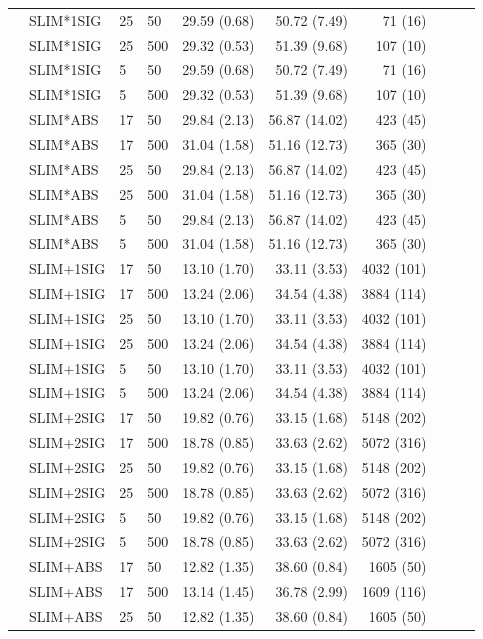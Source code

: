 \begin{longtable}{llllrrrrrr}
 & SLIM*1SIG & 25 & 50 & 29.59 (0.68) & 50.72 (7.49) & 71 (16) \\
 & SLIM*1SIG & 25 & 500 & 29.32 (0.53) & 51.39 (9.68) & 107 (10) \\
 & SLIM*1SIG & 5 & 50 & 29.59 (0.68) & 50.72 (7.49) & 71 (16) \\
 & SLIM*1SIG & 5 & 500 & 29.32 (0.53) & 51.39 (9.68) & 107 (10) \\
 & SLIM*ABS & 17 & 50 & 29.84 (2.13) & 56.87 (14.02) & 423 (45) \\
 & SLIM*ABS & 17 & 500 & 31.04 (1.58) & 51.16 (12.73) & 365 (30) \\
 & SLIM*ABS & 25 & 50 & 29.84 (2.13) & 56.87 (14.02) & 423 (45) \\
 & SLIM*ABS & 25 & 500 & 31.04 (1.58) & 51.16 (12.73) & 365 (30) \\
 & SLIM*ABS & 5 & 50 & 29.84 (2.13) & 56.87 (14.02) & 423 (45) \\
 & SLIM*ABS & 5 & 500 & 31.04 (1.58) & 51.16 (12.73) & 365 (30) \\
 & SLIM+1SIG & 17 & 50 & 13.10 (1.70) & 33.11 (3.53) & 4032 (101) \\
 & SLIM+1SIG & 17 & 500 & 13.24 (2.06) & 34.54 (4.38) & 3884 (114) \\
 & SLIM+1SIG & 25 & 50 & 13.10 (1.70) & 33.11 (3.53) & 4032 (101) \\
 & SLIM+1SIG & 25 & 500 & 13.24 (2.06) & 34.54 (4.38) & 3884 (114) \\
 & SLIM+1SIG & 5 & 50 & 13.10 (1.70) & 33.11 (3.53) & 4032 (101) \\
 & SLIM+1SIG & 5 & 500 & 13.24 (2.06) & 34.54 (4.38) & 3884 (114) \\
 & SLIM+2SIG & 17 & 50 & 19.82 (0.76) & 33.15 (1.68) & 5148 (202) \\
 & SLIM+2SIG & 17 & 500 & 18.78 (0.85) & 33.63 (2.62) & 5072 (316) \\
 & SLIM+2SIG & 25 & 50 & 19.82 (0.76) & 33.15 (1.68) & 5148 (202) \\
 & SLIM+2SIG & 25 & 500 & 18.78 (0.85) & 33.63 (2.62) & 5072 (316) \\
 & SLIM+2SIG & 5 & 50 & 19.82 (0.76) & 33.15 (1.68) & 5148 (202) \\
 & SLIM+2SIG & 5 & 500 & 18.78 (0.85) & 33.63 (2.62) & 5072 (316) \\
 & SLIM+ABS & 17 & 50 & 12.82 (1.35) & 38.60 (0.84) & 1605 (50) \\
 & SLIM+ABS & 17 & 500 & 13.14 (1.45) & 36.78 (2.99) & 1609 (116) \\
 & SLIM+ABS & 25 & 50 & 12.82 (1.35) & 38.60 (0.84) & 1605 (50) \\

\end{longtable}
